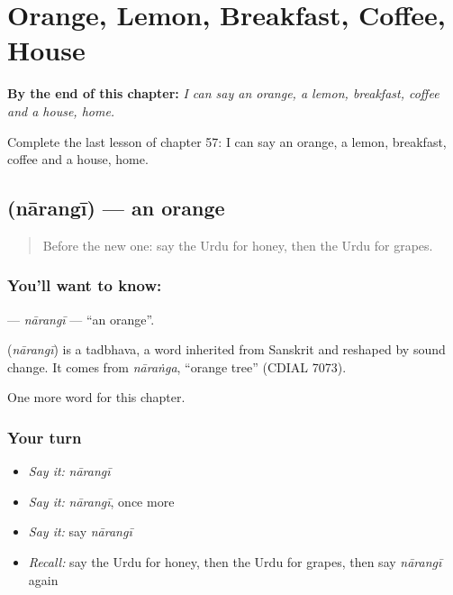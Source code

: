 
\chapter{Orange, Lemon, Breakfast, Coffee, House}
\label{ch:ur-orange-lemon-breakfast-coffee-house}

\begin{chapteropening}
\textbf{By the end of this chapter:} \emph{I can say an orange, a lemon, breakfast, coffee and a house, home.}

Complete the last lesson of chapter 57: I can say an orange, a lemon, breakfast, coffee and a house, home.
\end{chapteropening}

\section[\texorpdfstring{\ur{نارنگی} (nārangī)}{نارنگی (nārangī)}]{ (nārangī) — an orange}

\label{lesson:UR-C57-narangi}



\begin{quote}
Before the new one: say the Urdu for honey, then the Urdu for grapes.
\end{quote}

\subsection*{You'll want to know: }
\textbf{} — \emph{nārangī} — \textquotedblleft{}an orange\textquotedblright{}.

\begin{cousinweb}
\textbf{} (\emph{nārangī}) is a tadbhava, a word inherited from Sanskrit and reshaped by sound change. It comes from \emph{nāraṅga}, \textquotedblleft{}orange tree\textquotedblright{} (CDIAL 7073).
\end{cousinweb}

\begin{grammarlens}[title={What you've built}]
One more word for this chapter.
\end{grammarlens}

\subsection*{Your turn}
\begin{itemize}
\raggedright
  \item \emph{Say it:} \emph{nārangī}
  \item \emph{Say it:} \emph{nārangī}, once more
  \item \emph{Say it:} say \emph{nārangī}
  \item \emph{Recall:} say the Urdu for honey, then the Urdu for grapes, then say \emph{nārangī} again
\end{itemize}

